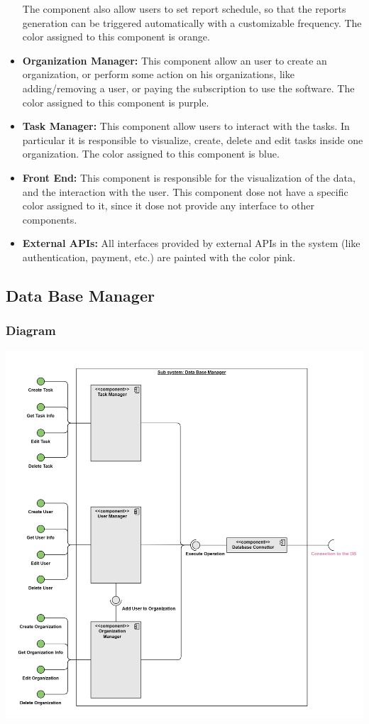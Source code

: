 \documentclass{article}
\begin{document}
\begin{itemize}
          The component also allow users to set report schedule, so that the reports generation can be triggered automatically with a customizable frequency.
          The color assigned to this component is \textcolor[HTML]{FA9646}{orange}.
    \item \textcolor[HTML]{FF00FF}{\textbf{Organization Manager: }} This component allow an user to create an organization, or perform some action on his organizations,
          like adding/removing a user, or paying the subscription to use the software. The color assigned to this component is \textcolor[HTML]{FF00FF}{purple}.
    \item \textcolor[HTML]{2682D5}{\textbf{Task Manager: }} This component allow users to interact with the tasks.
          In particular it is responsible to visualize, create, delete and edit tasks inside one organization. The color assigned to this component is \textcolor[HTML]{2682D5}{blue}.
    \item \textbf{Front End: } This component is responsible for the visualization of the data, and the interaction with the user. This component dose not have a specific color assigned to it, since it dose not provide any interface to other components.
    \item \textcolor[HTML]{E68CB4}{\textbf{External APIs: }} All interfaces provided by external APIs in the system (like authentication, payment, etc.) are painted with the color \textcolor[HTML]{E68CB4}{pink}.
\end{itemize}

\subsection{Data Base Manager}
\subsubsection{Diagram}
\includegraphics[width=\textwidth,height=\textheight,keepaspectratio]{images/component_diagram/data_base_manager.jpg}
\end{document}
